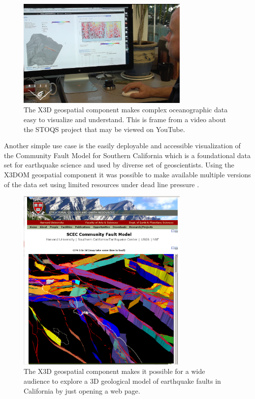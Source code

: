 \documentclass{acmsiggraph}                     %
\begin{document}
\begin{figure}[htbp]
\centering
\includegraphics[width=3.3in]{Application_STOQS.png}
\caption{The X3D geospatial component makes complex oceanographic data easy to visualize and understand. This is frame from a video about the STOQS project that may be viewed on YouTube.}
\label{fig:Application_STOQS.png}
\end{figure}

Another simple use case is the easily deployable and accessible visualization of the Community Fault Model for Southern California \cite{plesch07} which is a foundational data set for earthquake science and used by diverse set of geoscientists. Using the X3DOM geospatial component it was possible to make available multiple versions of the data set using limited resources under dead line pressure \cite{sger14}.

\begin{figure}[htbp]
\centering
\includegraphics[width=3.3in]{Application_SCEC.png}
\caption{The X3D geospatial component makes it possible for a wide audience to explore a 3D geological model of earthquake faults in California by just opening a web page.}
\label{fig:Application_SCEC.png}
\end{figure}
\end{document}
